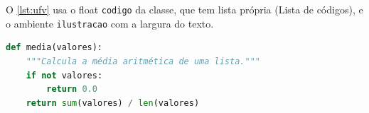 \documentclass{abntex2-ufv}
\begin{document}
O \autoref{lst:ufv} usa o float \texttt{codigo} da classe, que tem lista própria (Lista de
códigos), e o ambiente \texttt{ilustracao} com a largura do texto.

\begin{codigo}[htbp]
\begin{ilustracao}[\linewidth]{\caption{Função em Python}\label{lst:ufv}}%
                  {\elaboracaopropria}
\begin{lstlisting}[language=Python]
def media(valores):
    """Calcula a média aritmética de uma lista."""
    if not valores:
        return 0.0
    return sum(valores) / len(valores)
\end{lstlisting}
\end{ilustracao}
\end{codigo}
\end{document}
